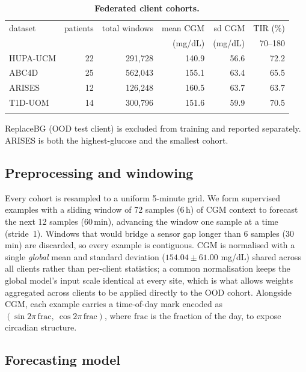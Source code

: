 \documentclass[10pt,letterpaper]{article}
\newlength\savedwidth
\newcommand\thickhline{\noalign{\global\savedwidth\arrayrulewidth\global\arrayrulewidth 2pt}%
\hline
\noalign{\global\arrayrulewidth\savedwidth}}
\begin{document}
\begin{table}[!ht]
\centering
\captionsetup{justification=centering,singlelinecheck=on}
\caption{\bf Federated client cohorts.}
\label{tab:datasets}
\begin{tabular}{lrrrrr}
\thickhline
dataset & patients & total windows & mean CGM & sd CGM & TIR (\%) \\
        &          &               & (mg/dL)  & (mg/dL) & 70--180  \\
\hline
HUPA-UCM & 22 & 291,728 & 140.9 & 56.6 & 72.2 \\
ABC4D    & 25 & 562,043 & 155.1 & 63.4 & 65.5 \\
ARISES   & 12 & 126,248 & 160.5 & 63.7 & 63.7 \\
T1D-UOM  & 14 & 300,796 & 151.6 & 59.9 & 70.5 \\
\thickhline
\end{tabular}
\begin{center}
{\small ReplaceBG (OOD test client) is excluded from training and reported
separately. ARISES is both the highest-glucose and the smallest cohort.}
\end{center}
\end{table}

\subsection*{Preprocessing and windowing}

Every cohort is resampled to a uniform 5-minute grid. We form supervised
examples with a sliding window of 72 samples (6\,h) of CGM context to forecast
the next 12 samples (60\,min), advancing the window one sample at a time
(stride~1). Windows that would bridge a sensor gap longer than 6 samples
(30\,min) are discarded, so every example is contiguous. CGM is normalised with
a single \emph{global} mean and standard deviation ($154.04 \pm 61.00$ mg/dL)
shared across all clients rather than per-client statistics; a common
normalisation keeps the global model's input scale identical at every site,
which is what allows weights aggregated across clients to be applied directly to
the OOD cohort. Alongside CGM, each example carries a time-of-day mark encoded
as $(\sin 2\pi\,\mathrm{frac},\ \cos 2\pi\,\mathrm{frac})$, where $\mathrm{frac}$
is the fraction of the day, to expose circadian structure.

\subsection*{Forecasting model}
\end{document}
